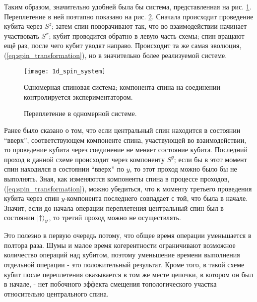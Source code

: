 \documentclass[a4paper,12pt]{article}
\theoremstyle{plain} %
\theoremstyle{definition} %
\theoremstyle{remark} %
\begin{document}
Таким образом, значительно удобней была бы система, представленная на рис. \ref{fig:1d_spin_system}. Переплетение в ней поэтапно показано на рис. \ref{fig:1d_braiding}. Сначала происходит проведение кубита через $S^z$; затем спин поворачивают так, что во взаимодействии начинает участвовать $S^x$; кубит проводится обратно в левую часть схемы; спин вращают ещё раз, после чего кубит уводят направо. Происходит та же самая эволюция, (\ref{eq:spin_transformation}), но в значительно более реализуемой системе.

\begin{figure}
    \centering
    \texttt{[image: 1d\_spin\_system]}
    \caption{Одномерная спиновая система; компонента спина на соединении контролируется экспериментатором.}
    \label{fig:1d_spin_system}
\end{figure}

\begin{figure}
    \centering
    \captionsetup[subfigure]{justification=centering}
    \caption{Переплетение в одномерной системе.}
    \label{fig:1d_braiding}
\end{figure}

Ранее было сказано о том, что если центральный спин находится в состоянии ``вверх'', соответствующем компоненте спина, участвующей во взаимодействии, то проведение кубита через соединение не меняет состояние кубита. Последний проход в данной схеме происходит через компоненту $S^y$; если бы в этот момент спин находился в состоянии ``вверх'' по $y$, то этот проход можно было бы не выполнять. Зная, как изменяются компоненты спина в процессе проходов, (\ref{eq:spin_transformation}), можно убедиться, что к моменту третьего проведения кубита через спин $y$-компонента последнего совпадает с той, что была в начале. Значит, если до начала операции переплетения центральный спин был в состоянии $\ket{\uparrow}_y$, то третий проход можно не осуществлять.

Это полезно в первую очередь потому, что общее время операции уменьшается в полтора раза. Шумы и малое время когерентности ограничивают возможное количество операций над кубитом, поэтому уменьшение времени выполнения отдельной операции - это положительный результат. Кроме того, в такой схеме кубит после переплетения оказывается в том же месте цепочки, в котором он был в начале, - нет побочного эффекта смещения топологического участка относительно центрального спина.
\end{document}
